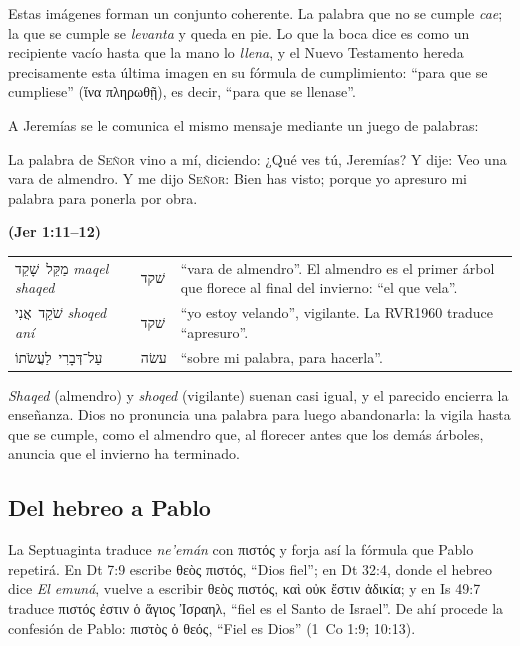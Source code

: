 \documentclass[11pt,letterpaper]{article}
\newcommand{\heb}[1]{\mbox{\foreignlanguage{hebrew}{#1}}}
\newcommand{\grc}[1]{\foreignlanguage{ancientgreek}{#1}}
\newcommand{\SENOR}{\textsc{Señor}}
\newcommand{\fuente}[1]{\par\hfill{\upshape\bfseries\small\textcolor{azul}{#1}}}
\begin{document}
Estas imágenes forman un conjunto coherente. La palabra que no se cumple \emph{cae}; la que se cumple se \emph{levanta} y queda en pie. Lo que la boca dice es como un recipiente vacío hasta que la mano lo \emph{llena}, y el Nuevo Testamento hereda precisamente esta última imagen en su fórmula de cumplimiento: ``para que se cumpliese'' (\grc{ἵνα πληρωθῇ}), es decir, ``para que se llenase''.

A Jeremías se le comunica el mismo mensaje mediante un juego de palabras:

\begin{cita}La palabra de \SENOR{} vino a mí, diciendo: ¿Qué ves tú, Jeremías? Y dije: Veo una vara de almendro. Y me dijo \SENOR: Bien has visto; porque yo apresuro mi palabra para ponerla por obra.\fuente{(Jer 1:11--12)}\end{cita}

\begin{filologia}[Jer 1:11--12]
\begin{tabular}{@{}L{3.2cm}L{1.6cm}L{10cm}@{}}
\heb{מַקֵּל שָׁקֵד} \emph{maqel shaqed} & \heb{שׁקד} & ``vara de almendro''. El almendro es el primer árbol que florece al final del invierno: ``el que vela''. \\[2pt]
\heb{שֹׁקֵד אֲנִי} \emph{shoqed aní} & \heb{שׁקד} & ``yo estoy velando'', vigilante. La RVR1960 traduce ``apresuro''. \\[2pt]
\heb{עַל־דְּבָרִי לַעֲשֹׂתוֹ} & \heb{עשׂה} & ``sobre mi palabra, para hacerla''. \\
\end{tabular}
\end{filologia}

\emph{Shaqed} (almendro) y \emph{shoqed} (vigilante) suenan casi igual, y el parecido encierra la enseñanza. Dios no pronuncia una palabra para luego abandonarla: la vigila hasta que se cumple, como el almendro que, al florecer antes que los demás árboles, anuncia que el invierno ha terminado.

\subsection{Del hebreo a Pablo}
La Septuaginta traduce \emph{ne'emán} con \grc{πιστός} y forja así la fórmula que Pablo repetirá. En Dt 7:9 escribe \grc{θεὸς πιστός}, ``Dios fiel''; en Dt 32:4, donde el hebreo dice \emph{El emuná}, vuelve a escribir \grc{θεὸς πιστός, καὶ οὐκ ἔστιν ἀδικία}; y en Is 49:7 traduce \grc{πιστός ἐστιν ὁ ἅγιος Ἰσραηλ}, ``fiel es el Santo de Israel''. De ahí procede la confesión de Pablo: \grc{πιστὸς ὁ θεός}, ``Fiel es Dios'' (1~Co 1:9; 10:13).
\end{document}
